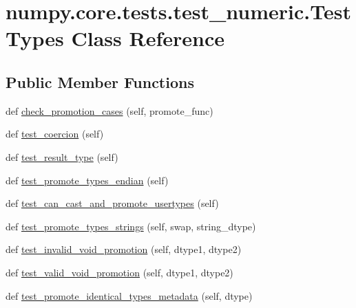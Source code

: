\hypertarget{classnumpy_1_1core_1_1tests_1_1test__numeric_1_1TestTypes}{}\section{numpy.\+core.\+tests.\+test\+\_\+numeric.\+Test\+Types Class Reference}
\label{classnumpy_1_1core_1_1tests_1_1test__numeric_1_1TestTypes}
\subsection*{Public Member Functions}
\begin{DoxyCompactItemize}
\item 
def \hyperlink{classnumpy_1_1core_1_1tests_1_1test__numeric_1_1TestTypes_a4077739b913721b1751b935f71adc673}{check\+\_\+promotion\+\_\+cases} (self, promote\+\_\+func)
\item 
def \hyperlink{classnumpy_1_1core_1_1tests_1_1test__numeric_1_1TestTypes_a4702f04dc4c182183390ef4619c739d3}{test\+\_\+coercion} (self)
\item 
def \hyperlink{classnumpy_1_1core_1_1tests_1_1test__numeric_1_1TestTypes_acdede007fb65e505f8d1c0192accf82b}{test\+\_\+result\+\_\+type} (self)
\item 
def \hyperlink{classnumpy_1_1core_1_1tests_1_1test__numeric_1_1TestTypes_acdfd2dae03d96ff637ed31bd75410395}{test\+\_\+promote\+\_\+types\+\_\+endian} (self)
\item 
def \hyperlink{classnumpy_1_1core_1_1tests_1_1test__numeric_1_1TestTypes_a78485e37145f816338ec291331cf42ae}{test\+\_\+can\+\_\+cast\+\_\+and\+\_\+promote\+\_\+usertypes} (self)
\item 
def \hyperlink{classnumpy_1_1core_1_1tests_1_1test__numeric_1_1TestTypes_a077075a7e0ff8ca6c4d7c9b9d2a1cb16}{test\+\_\+promote\+\_\+types\+\_\+strings} (self, swap, string\+\_\+dtype)
\item 
def \hyperlink{classnumpy_1_1core_1_1tests_1_1test__numeric_1_1TestTypes_a55028c50836532dfecf0fe01077a33ac}{test\+\_\+invalid\+\_\+void\+\_\+promotion} (self, dtype1, dtype2)
\item 
def \hyperlink{classnumpy_1_1core_1_1tests_1_1test__numeric_1_1TestTypes_adac2ef974c9af5869ea5d35dc90ca08e}{test\+\_\+valid\+\_\+void\+\_\+promotion} (self, dtype1, dtype2)
\item 
def \hyperlink{classnumpy_1_1core_1_1tests_1_1test__numeric_1_1TestTypes_afeb35a3d2cd1ce122206a8fcf1ed6f17}{test\+\_\+promote\+\_\+identical\+\_\+types\+\_\+metadata} (self, dtype)

\end{DoxyCompactItemize}
